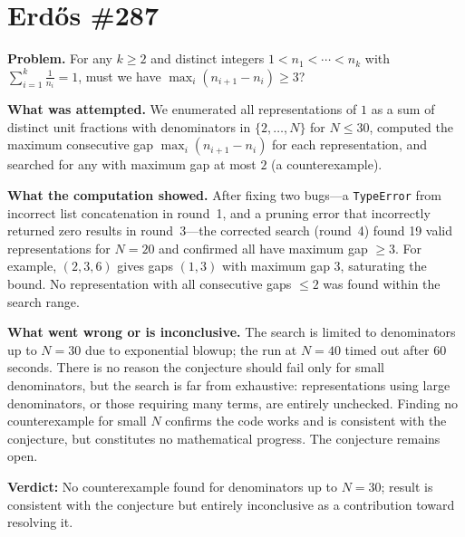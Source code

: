 \section{Erdős \#287}

\textbf{Problem.} For any $k \geq 2$ and distinct integers $1 < n_1 < \cdots < n_k$ with
$\sum_{i=1}^{k} \frac{1}{n_i} = 1$, must we have $\max_i(n_{i+1} - n_i) \geq 3$?

\textbf{What was attempted.} We enumerated all representations of $1$ as a sum of distinct
unit fractions with denominators in $\{2, \ldots, N\}$ for $N \leq 30$, computed the
maximum consecutive gap $\max_i(n_{i+1}-n_i)$ for each representation, and searched for
any with maximum gap at most $2$ (a counterexample).

\textbf{What the computation showed.} After fixing two bugs---a \texttt{TypeError} from
incorrect list concatenation in round~1, and a pruning error that incorrectly returned
zero results in round~3---the corrected search (round~4) found 19 valid representations
for $N=20$ and confirmed all have maximum gap $\geq 3$. For example,
$(2,3,6)$ gives gaps $(1,3)$ with maximum gap $3$, saturating the bound.
No representation with all consecutive gaps $\leq 2$ was found within the search range.

\textbf{What went wrong or is inconclusive.} The search is limited to denominators up to
$N=30$ due to exponential blowup; the run at $N=40$ timed out after 60 seconds.
There is no reason the conjecture should fail only for small denominators, but the
search is far from exhaustive: representations using large denominators, or those
requiring many terms, are entirely unchecked. Finding no counterexample for small $N$
confirms the code works and is consistent with the conjecture, but constitutes no
mathematical progress. The conjecture remains open.

\textbf{Verdict:} No counterexample found for denominators up to $N=30$; result is
consistent with the conjecture but entirely inconclusive as a contribution toward
resolving it.